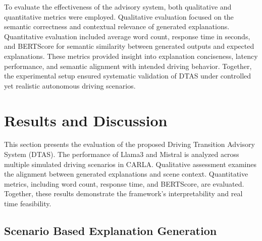 \documentclass[a4paper,12pt,one side]{report}
\theoremstyle{definition}
\begin{document}
\begin{itemize}
To evaluate the effectiveness of the advisory system, both qualitative and quantitative metrics were employed. Qualitative evaluation focused on the semantic correctness and contextual relevance of generated explanations. Quantitative evaluation included average word count, response time in seconds, and BERTScore for semantic similarity between generated outputs and expected explanations. These metrics provided insight into explanation conciseness, latency performance, and semantic alignment with intended driving behavior. Together, the experimental setup ensured systematic validation of DTAS under controlled yet realistic autonomous driving scenarios.

\section{Results and Discussion}

This section presents the evaluation of the proposed Driving Transition Advisory System (DTAS). The performance of Llama3 and Mistral is analyzed across multiple simulated driving scenarios in CARLA. Qualitative assessment examines the alignment between generated explanations and scene context. Quantitative metrics, including word count, response time, and BERTScore, are evaluated. Together, these results demonstrate the framework's interpretability and real time feasibility.

\subsection{Scenario Based Explanation Generation}


\end{itemize}
\end{document}
